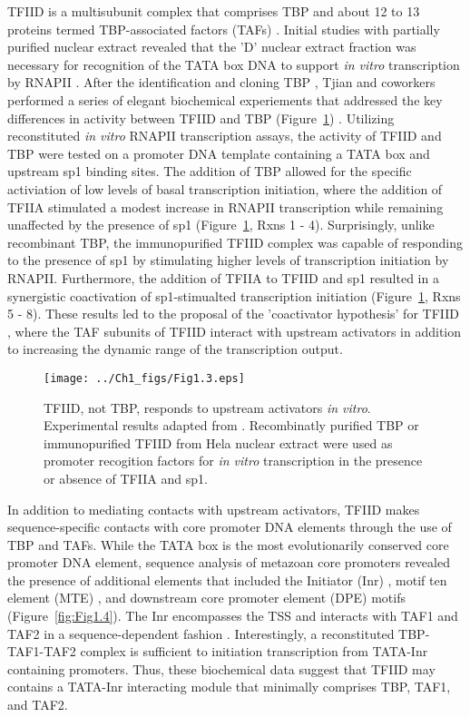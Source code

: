 TFIID is a multisubunit complex that comprises TBP and about 12 to 13 proteins termed TBP-associated factors (TAFs) \cite{Burley_3049}. Initial studies with partially purified nuclear extract revealed that the 'D' nuclear extract fraction was necessary for recognition of the TATA box DNA to support \emph{in vitro} transcription by RNAPII \cite{Matsui_3980}. After the identification and cloning TBP \cite{Buratowski_1988}, Tjian and coworkers performed a series of elegant biochemical experiements that addressed the key differences in activity between TFIID and TBP  (Figure~\ref{fig:Fig1.3})  \cite{Pugh_3586,Dynlacht_3551}. Utilizing reconstituted \emph{in vitro} RNAPII transcription assays, the activity of TFIID and TBP were tested on a promoter DNA template containing a TATA box and upstream sp1 binding sites. The addition of TBP allowed for the specific activiation of low levels of basal transcription initiation, where the addition of TFIIA stimulated a modest increase in RNAPII transcription while remaining unaffected by the presence of sp1 (Figure~\ref{fig:Fig1.3}, Rxns 1 - 4). Surprisingly, unlike recombinant TBP, the immunopurified TFIID complex was capable of responding to the presence of sp1 by stimulating higher levels of transcription initiation by RNAPII.  Furthermore, the addition of TFIIA to TFIID and sp1 resulted in a synergistic coactivation of sp1-stimualted transcription initiation (Figure~\ref{fig:Fig1.3}, Rxns 5 - 8). These results led to the proposal of the 'coactivator hypothesis' for TFIID \cite{Pugh_3586}, where the TAF subunits of TFIID interact with upstream activators in addition to increasing the dynamic range of the transcription output. \\
\begin{figure}
\centering
\texttt{[image: ../Ch1\_figs/Fig1.3.eps]}
\caption[TFIID, not TBP, responds to upstream activitors \emph{in vitro}]{TFIID, not TBP, responds to upstream activators \emph{in vitro}. Experimental results adapted from \cite{Pugh_3586,Dynlacht_3551}. Recombinatly purified TBP or immunopurified TFIID from Hela nuclear extract were used as promoter recogition factors for \emph{in vitro} transcription in the presence or absence of TFIIA and sp1.} 
\label{fig:Fig1.3}
\end{figure}
\indent In addition to mediating contacts with upstream activators, TFIID makes sequence-specific contacts with core promoter DNA elements through the use of TBP and TAFs. While the TATA box is the most evolutionarily conserved core promoter DNA element, sequence analysis of metazoan core promoters revealed the presence of additional elements that included the Initiator (Inr) \cite{Smale_3697}, motif ten element (MTE) \cite{Lim_1522}, and downstream core promoter element (DPE) \cite{Burke_3081} motifs (Figure~\ref{fig:Fig1.4}). The Inr encompasses the TSS and interacts with TAF1 and TAF2 in a sequence-dependent fashion \cite{Verrijzer_3120,Chalkley_2339}. Interestingly, a reconstituted TBP-TAF1-TAF2 complex is sufficient to initiation transcription from TATA-Inr containing promoters.  Thus, these biochemical data suggest that TFIID may contains a TATA-Inr interacting module that minimally comprises TBP, TAF1, and TAF2. \\
